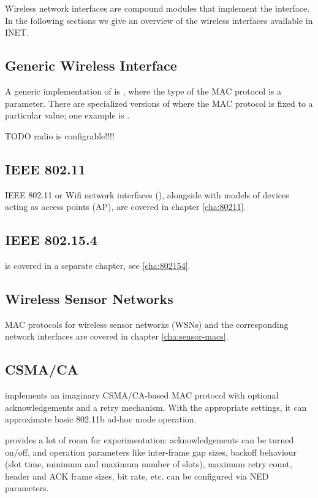Wireless network interfaces are compound modules that implement the 
 interface. In the following sections we 
give an overview of the wireless interfaces available in INET.

\subsection{Generic Wireless Interface}

A generic implementation of  is 
, where the type of the MAC protocol is a parameter.
There are specialized versions of  where 
the MAC protocol is fixed to a particular value; one example is 
.

TODO radio is configrable!!!!


\subsection{IEEE 802.11}

IEEE 802.11 or Wifi network interfaces (),
alongside with models of devices acting as access points (AP),
are covered in chapter \ref{cha:80211}.

\subsection{IEEE 802.15.4}

 is covered in a separate chapter, see \ref{cha:802154}.

\subsection{Wireless Sensor Networks}

MAC protocols for wireless sensor networks (WSNs) and the corresponding
network interfaces are covered in chapter \ref{cha:sensor-macs}.

\subsection{CSMA/CA} 

 implements an imaginary CSMA/CA-based MAC protocol with
optional acknowledgements and a retry mechanism. With the appropriate settings,
it can approximate basic 802.11b ad-hoc mode operation.

 provides a lot of room for experimentation: 
acknowledgements can be turned on/off, and operation parameters like
inter-frame gap sizes, backoff behaviour (slot time, minimum and maximum 
number of slots), maximum retry count, header and ACK frame sizes, bit rate,
etc. can be configured via NED parameters.

